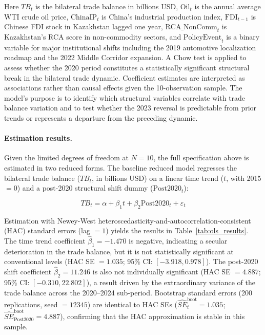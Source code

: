 \documentclass[12pt]{article}
\begin{document}
Here $TB_t$ is the bilateral trade balance in billions USD, $\text{Oil}_t$ is the annual average WTI crude oil price, $\text{ChinaIP}_t$ is China's industrial production index, $\text{FDI}_{t-1}$ is Chinese FDI stock in Kazakhstan lagged one year, $\text{RCA\_NonComm}_t$ is Kazakhstan's RCA score in non-commodity sectors, and $\text{PolicyEvent}_t$ is a binary variable for major institutional shifts including the 2019 automotive localization roadmap and the 2022 Middle Corridor expansion. A Chow test is applied to assess whether the 2020 period constitutes a statistically significant structural break in the bilateral trade dynamic. Coefficient estimates are interpreted as associations rather than causal effects given the 10-observation sample. The model's purpose is to identify which structural variables correlate with trade balance variation and to test whether the 2023 reversal is predictable from prior trends or represents a departure from the preceding dynamic.

\paragraph{Estimation results.} Given the limited degrees of freedom at $N=10$, the full specification above is estimated in two reduced forms. The baseline reduced model regresses the bilateral trade balance ($TB_t$, in billions USD) on a linear time trend ($t$, with 2015 $= 0$) and a post-2020 structural shift dummy ($\text{Post2020}_t$):

\begin{equation}
TB_t = \alpha + \beta_1 t + \beta_2 \text{Post2020}_t + \varepsilon_t
\end{equation}

Estimation with Newey-West heteroscedasticity-and-autocorrelation-consistent (HAC) standard errors (lag $= 1$) yields the results in Table~\ref{tab:ols_results}. The time trend coefficient $\hat{\beta}_1 = -1.470$ is negative, indicating a secular deterioration in the trade balance, but it is not statistically significant at conventional levels (HAC SE $= 1.035$; 95\% CI: $[-3.918, 0.978]$). The post-2020 shift coefficient $\hat{\beta}_2 = 11.246$ is also not individually significant (HAC SE $= 4.887$; 95\% CI: $[-0.310, 22.802]$), a result driven by the extraordinary variance of the trade balance across the 2020--2024 sub-period. Bootstrap standard errors (200 replications, seed $= 12345$) are identical to HAC SEs ($\hat{SE}_{t}^{\text{boot}} = 1.035$; $\hat{SE}_{\text{Post2020}}^{\text{boot}} = 4.887$), confirming that the HAC approximation is stable in this sample.
\end{document}
